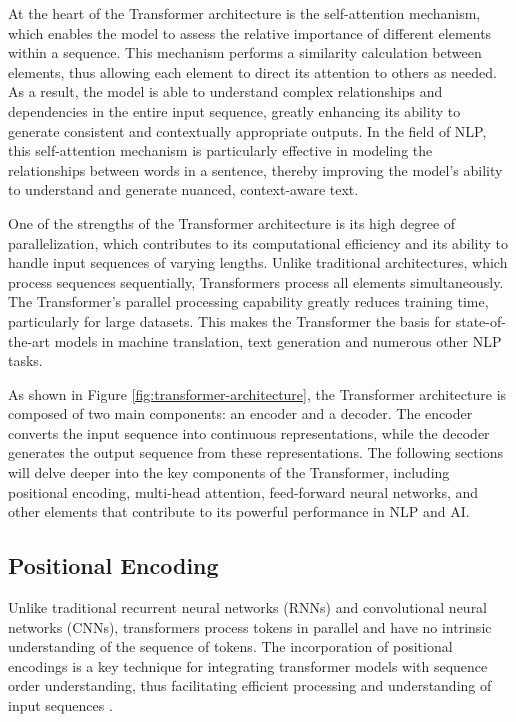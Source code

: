 At the heart of the Transformer architecture is the self-attention mechanism, which enables the model to assess the relative importance of different elements within a sequence. This mechanism performs a similarity calculation between elements, thus allowing each element to direct its attention to others as needed. As a result, the model is able to understand complex relationships and dependencies in the entire input sequence, greatly enhancing its ability to generate consistent and contextually appropriate outputs. In the field of NLP, this self-attention mechanism is particularly effective in modeling the relationships between words in a sentence, thereby improving the model's ability to understand and generate nuanced, context-aware text.

One of the strengths of the Transformer architecture is its high degree of parallelization, which contributes to its computational efficiency and its ability to handle input sequences of varying lengths. Unlike traditional architectures, which process sequences sequentially, Transformers process all elements simultaneously. The Transformer's parallel processing capability greatly reduces training time, particularly for large datasets. This makes the Transformer the basis for state-of-the-art models in machine translation, text generation and numerous other NLP tasks.

As shown in Figure \ref{fig:transformer-architecture}, the Transformer architecture is composed of two main components: an encoder and a decoder. The encoder converts the input sequence into continuous representations, while the decoder generates the output sequence from these representations. The following sections will delve deeper into the key components of the Transformer, including positional encoding, multi-head attention, feed-forward neural networks, and other elements that contribute to its powerful performance in NLP and AI.

\subsection{Positional Encoding}

Unlike traditional recurrent neural networks (RNNs) and convolutional neural networks (CNNs), transformers process tokens in parallel and have no intrinsic understanding of the sequence of tokens. The incorporation of positional encodings is a key technique for integrating transformer models with sequence order understanding, thus facilitating efficient processing and understanding of input sequences \cite{li2023transformer}.


